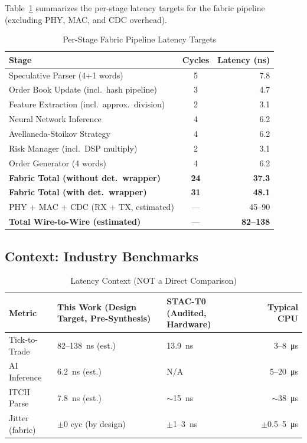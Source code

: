 \documentclass[conference,10pt]{IEEEtran}
\begin{document}
Table~\ref{tab:latency} summarizes the per-stage latency targets for the fabric pipeline (excluding PHY, MAC, and CDC overhead).

\begin{table}[h]
\centering
\caption{Per-Stage Fabric Pipeline Latency Targets}
\label{tab:latency}
\begin{tabular}{@{}lcr@{}}
\toprule
Stage & Cycles & Latency (ns) \\
\midrule
Speculative Parser (4+1 words) & 5 & 7.8 \\
Order Book Update (incl.\ hash pipeline) & 3 & 4.7 \\
Feature Extraction (incl.\ approx.\ division) & 2 & 3.1 \\
Neural Network Inference & 4 & 6.2 \\
Avellaneda-Stoikov Strategy & 4 & 6.2 \\
Risk Manager (incl.\ DSP multiply) & 2 & 3.1 \\
Order Generator (4 words) & 4 & 6.2 \\
\midrule
\textbf{Fabric Total (without det.\ wrapper)} & \textbf{24} & \textbf{37.3} \\
\textbf{Fabric Total (with det.\ wrapper)} & \textbf{31} & \textbf{48.1} \\
\midrule
PHY + MAC + CDC (RX + TX, estimated) & --- & 45--90 \\
\midrule
\textbf{Total Wire-to-Wire (estimated)} & --- & \textbf{82--138} \\
\bottomrule
\end{tabular}
\end{table}

\subsection{Context: Industry Benchmarks}

\begin{table}[h]
\centering
\caption{Latency Context (NOT a Direct Comparison)}
\label{tab:comparison}
\begin{tabular}{@{}lp{2.5cm}p{2cm}r@{}}
\toprule
Metric & This Work (Design Target, Pre-Synthesis) & STAC-T0 (Audited, Hardware) & Typical CPU \\
\midrule
Tick-to-Trade & 82--138~ns (est.) & 13.9~ns & 3--8~\si{\micro\second} \\
AI Inference & 6.2~ns (est.) & N/A & 5--20~\si{\micro\second} \\
ITCH Parse & 7.8~ns (est.) & $\sim$15~ns & $\sim$38~\si{\micro\second} \\
Jitter (fabric) & $\pm$0 cyc (by design) & $\pm$1--3~ns & $\pm$0.5--5~\si{\micro\second} \\
\bottomrule
\end{tabular}
\end{table}
\end{document}

